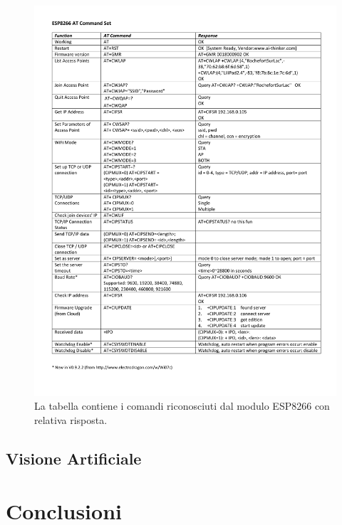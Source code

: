 \documentclass [11pt ,a4paper ,twoside ]{report}
\begin{document}
\begin{figure}
	\centering
		\hspace*{-2cm}\includegraphics[width=1.30\textwidth]{Images/CommandsSet.pdf}
	\caption{La tabella contiene i comandi riconosciuti dal modulo ESP8266 con relativa risposta.}
	\label{fig:commands}
\end{figure}


\section{Visione Artificiale}


\chapter{Conclusioni}
\end{document}
